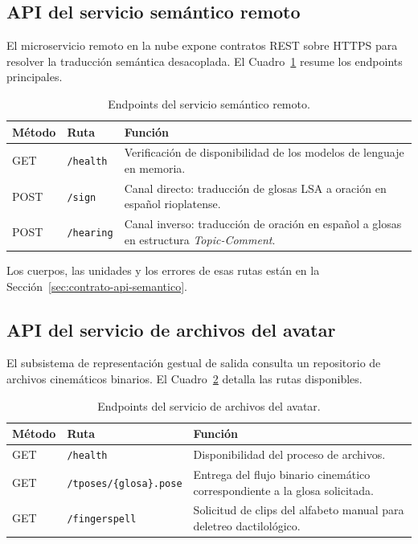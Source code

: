 \subsection{API del servicio semántico remoto}
\label{sec:api-semantico-remoto}
El microservicio remoto en la nube expone contratos REST sobre HTTPS para resolver la traducción semántica desacoplada. El Cuadro~\ref{tab:api-semantico-endpoints} resume los endpoints principales.

\begin{table}[H]
  \centering
  \caption{Endpoints del servicio semántico remoto.}
  \label{tab:api-semantico-endpoints}
  \begin{tabular}{@{}llp{8.2cm}@{}}
    \toprule
    Método & Ruta & Función \\
    \midrule
    GET & \texttt{/health} & Verificación de disponibilidad de los modelos de lenguaje en memoria. \\
    POST & \texttt{/sign} & Canal directo: traducción de glosas LSA a oración en español rioplatense. \\
    POST & \texttt{/hearing} & Canal inverso: traducción de oración en español a glosas en estructura \textit{Topic-Comment}. \\
    \bottomrule
  \end{tabular}
\end{table}

Los cuerpos, las unidades y los errores de esas rutas están en la Sección~\ref{sec:contrato-api-semantico}.

\subsection{API del servicio de archivos del avatar}
\label{sec:api-avatar}
El subsistema de representación gestual de salida consulta un repositorio de archivos cinemáticos binarios. El Cuadro~\ref{tab:api-avatar-endpoints} detalla las rutas disponibles.

\begin{table}[H]
  \centering
  \caption{Endpoints del servicio de archivos del avatar.}
  \label{tab:api-avatar-endpoints}
  \begin{tabular}{@{}llp{7.6cm}@{}}
    \toprule
    Método & Ruta & Función \\
    \midrule
    GET & \texttt{/health} & Disponibilidad del proceso de archivos. \\
    GET & \texttt{/tposes/\{glosa\}.pose} & Entrega del flujo binario cinemático correspondiente a la glosa solicitada. \\
    GET & \texttt{/fingerspell} & Solicitud de clips del alfabeto manual para deletreo dactilológico. \\
    \bottomrule
  \end{tabular}
\end{table}

